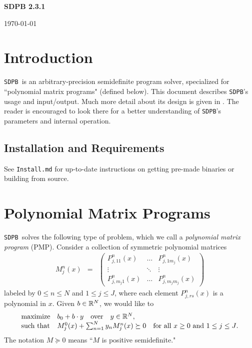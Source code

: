 \documentclass[12pt]{article}
\numberwithin{equation}{section}
\renewcommand{\be}{\begin{eqnarray}}
\renewcommand{\ee}{\end{eqnarray}}
\newcommand\SDPB{\texttt{SDPB}}
\begin{document}
{\Large
\begin{center}
{\bf SDPB 2.3.1 \\\vspace{.1in}}
\end{center}
}
\begin{center}
\noindent \today
\end{center}
\tableofcontents

\section{Introduction}

\SDPB\ is an arbitrary-precision semidefinite program solver, specialized for ``polynomial matrix programs" (defined below).  This document describes \SDPB's usage and input/output.  Much more detail about its design is given in \cite{DSD}. The reader is encouraged to look there for a better understanding of \SDPB's parameters and internal operation.

\subsection{Installation and Requirements}

See \texttt{Install.md} for up-to-date instructions on getting
pre-made binaries or building from source.

\section{Polynomial Matrix Programs}
\label{sec:PMP}

\SDPB\ solves the following type of problem, which we call a {\it polynomial matrix program} (PMP).  Consider a collection of symmetric polynomial matrices
\be
M_j^n(x) &=& \begin{pmatrix}
P_{j,11}^{n}(x) & \dots & P_{j,1m_j}^{n}(x)\\
\vdots & \ddots & \vdots\\
P_{j,m_j1}^{n}(x) & \dots & P^{n}_{j,m_jm_j}(x)
\end{pmatrix}
\ee
labeled by $0 \leq n \leq N$ and $1 \leq j \leq J$,
where each element $P_{j,rs}^{n}(x)$ is a polynomial in $x$.  
Given $b\in \mathbb{R}^N$, we would like to
\be
\label{eq:PMPconstraint}
\begin{array}{ll}
\textrm{maximize} & b_0+b\.y\quad\textrm{over}\quad y \in \R^N,\\
\textrm{such that} & M^0_j(x)+\sum_{n=1}^{N} y_n M^n_j(x) \succeq 0 \quad \textrm{for all $x\geq 0$ and $1 \leq j \leq J$}.
\end{array}
\ee
The notation $M\succeq 0$ means ``$M$ is positive semidefinite."
\end{document}
